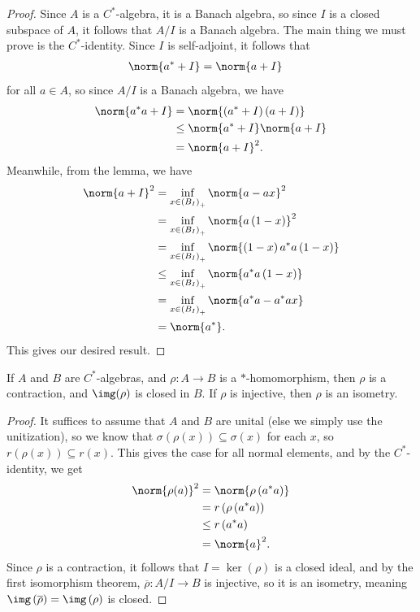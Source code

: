\documentclass[10pt]{mypackage}
\begin{document}
\begin{proof}
  Since $A$ is a $C^{\ast}$-algebra, it is a Banach algebra, so since $I$ is a closed subspace of $A$, it follows that $A/I$ is a Banach algebra. The main thing we must prove is the $C^{\ast}$-identity. Since $I$ is self-adjoint, it follows that
  \begin{align*}
    \norm{a^{\ast} + I} &= \norm{a + I}
  \end{align*}
  for all $a\in A$, so since $A/I$ is a Banach algebra, we have
  \begin{align*}
    \norm{a^{\ast}a + I} &= \norm{\left( a^{\ast} + I \right)\left( a+I \right)}\\
                         &\leq \norm{a^{\ast} + I} \norm{a + I}\\
                         &= \norm{a + I}^2.
  \end{align*}
  Meanwhile, from the lemma, we have
  \begin{align*}
    \norm{a+I}^2 &= \inf_{x\in \left( B_I \right)_{+}} \norm{a-ax}^2\\
                 &= \inf_{x\in \left( B_{I} \right)_{+}} \norm{a \left( 1-x \right)}^2\\
                 &= \inf_{x\in \left( B_{I} \right)_{+}} \norm{\left( 1-x \right)a^{\ast}a\left( 1-x \right)}\\
                 &\leq \inf_{x\in \left( B_I \right)_{+}}\norm{a^{\ast}a\left( 1-x \right)}\\
                 &= \inf_{x\in \left( B_{I} \right)_{+}} \norm{a^{\ast}a - a^{\ast}ax}\\
                 &= \norm{a^{\ast}}.
  \end{align*}
  This gives our desired result.
\end{proof}
\begin{theorem}
  If $A$ and $B$ are $C^{\ast}$-algebras, and $\rho\colon A\rightarrow B$ is a $\ast$-homomorphism, then $\rho$ is a contraction, and $\img(\rho)$ is closed in $B$. If $\rho$ is injective, then $\rho$ is an isometry.
\end{theorem}
\begin{proof}
  It suffices to assume that $A$ and $B$ are unital (else we simply use the unitization), so we know that $\sigma\left( \rho(x) \right)\subseteq \sigma(x)$ for each $x$, so $r\left( \rho(x) \right)\subseteq r(x)$. This gives the case for all normal elements, and by the $C^{\ast}$-identity, we get
  \begin{align*}
    \norm{\rho(a)}^2 &=\norm{\rho\left( a^{\ast}a \right)}\\
                     &= r\left( \rho\left( a^{\ast}a \right) \right)\\
                     &\leq r\left( a^{\ast}a \right)\\
                     &= \norm{a}^2.
  \end{align*}
  Since $\rho$ is a contraction, it follows that $I = \ker\left( \rho \right)$ is a closed ideal, and by the first isomorphism theorem, $ \overline{\rho}\colon A/I\rightarrow B $ is injective, so it is an isometry, meaning $\img\left( \overline{\rho} \right) = \img\left( \rho \right)$ is closed.
\end{proof}
\end{document}

